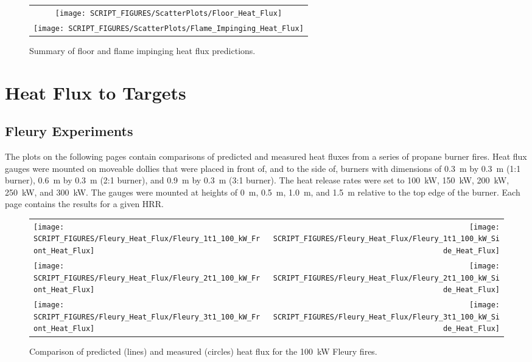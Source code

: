 \begin{figure}[h!]
\begin{center}
\begin{tabular}{c}
\texttt{[image: SCRIPT\_FIGURES/ScatterPlots/Floor\_Heat\_Flux]} \\
\texttt{[image: SCRIPT\_FIGURES/ScatterPlots/Flame\_Impinging\_Heat\_Flux]}
\end{tabular}
\end{center}
\caption[Summary of floor and flame impinging heat flux predictions]
{Summary of floor and flame impinging heat flux predictions.}
\end{figure}



\clearpage

\section{Heat Flux to Targets}

\subsection{Fleury Experiments}

The plots on the following pages contain comparisons of predicted and measured heat fluxes from a series of propane burner fires. Heat flux gauges were mounted on moveable dollies that were placed in front of, and to the side of, burners with dimensions of 0.3~m by 0.3~m (1:1 burner), 0.6~m by 0.3~m (2:1 burner), and 0.9~m by 0.3~m (3:1 burner). The heat release rates were set to 100~kW, 150~kW, 200~kW, 250~kW, and 300~kW. The gauges were mounted at heights of 0~m, 0.5~m, 1.0~m, and 1.5~m relative to the top edge of the burner. Each page contains the results for a given HRR.

\begin{figure}[h!]
\begin{tabular*}{\textwidth}{l@{\extracolsep{\fill}}r}
\texttt{[image: SCRIPT\_FIGURES/Fleury\_Heat\_Flux/Fleury\_1t1\_100\_kW\_Front\_Heat\_Flux]} &
\texttt{[image: SCRIPT\_FIGURES/Fleury\_Heat\_Flux/Fleury\_1t1\_100\_kW\_Side\_Heat\_Flux]} \\
\texttt{[image: SCRIPT\_FIGURES/Fleury\_Heat\_Flux/Fleury\_2t1\_100\_kW\_Front\_Heat\_Flux]} &
\texttt{[image: SCRIPT\_FIGURES/Fleury\_Heat\_Flux/Fleury\_2t1\_100\_kW\_Side\_Heat\_Flux]} \\
\texttt{[image: SCRIPT\_FIGURES/Fleury\_Heat\_Flux/Fleury\_3t1\_100\_kW\_Front\_Heat\_Flux]} &
\texttt{[image: SCRIPT\_FIGURES/Fleury\_Heat\_Flux/Fleury\_3t1\_100\_kW\_Side\_Heat\_Flux]}
\end{tabular*}
\label{Fleury_Heat_Flux_100_kW}
\caption[Fleury Heat Flux, 100 kW fires.]
{Comparison of predicted (lines) and measured (circles) heat flux for the 100~kW Fleury fires.}
\end{figure}

